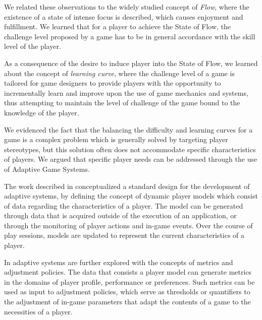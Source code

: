 We related these observations to the widely studied concept of \emph{Flow}, where the existence of a state of intense focus is described, which causes enjoyment and fulfillment. We learned that for a player to achieve the State of Flow, the challenge level proposed by a game has to be in general accordance with the skill level of the player.

As a consequence of the desire to induce player into the State of Flow, we learned about the concept of \emph{learning curve}, where the challenge level of a game is tailored for game designers to provide players with the opportunity to incrementally learn and improve upon the use of game mechanics and systems, thus attempting to maintain the level of challenge of the game bound to the knowledge of the player.

We evidenced the fact that the balancing the difficulty and learning curves for a game is a complex problem which is generally solved by targeting player stereotypes, but this solution often does not accommodate specific characteristics of players. We argued that specific player needs can be addressed through the use of Adaptive Game Systems.

The work described in \cite{ARTICLE_PlayerCentredGameDesign} conceptualized a standard design for the development of adaptive systems, by defining the concept of dynamic player models which consist of data regarding the characteristics of a player. The model can be generated through data that is acquired outside of the execution of an application, or through the monitoring of player actions and in-game events. Over the course of play sessions, models are updated to represent the current characteristics of a player.

In \cite{PHD_DynamicDifficultyAdjustment} adaptive systems are further explored with the concepts of metrics and adjustment policies. The data that consists a player model can generate metrics in the domains of player profile, performance or preferences. Such metrics can be used as input to adjustment policies, which serve as thresholds or quantifiers to the adjustment of in-game parameters that adapt the contents of a game to the necessities of a player.

